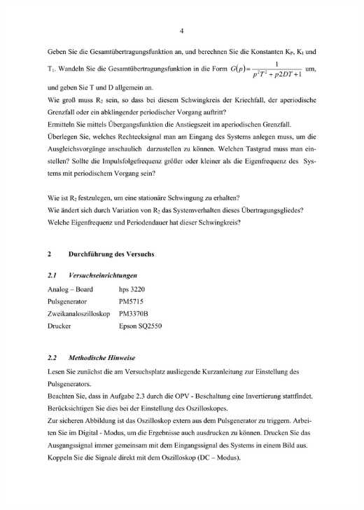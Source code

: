\includegraphics[width=1.0\textwidth]{Bilder/Grundubertragungsglieder im Zeitbereich (verschoben) 4}\newpage
